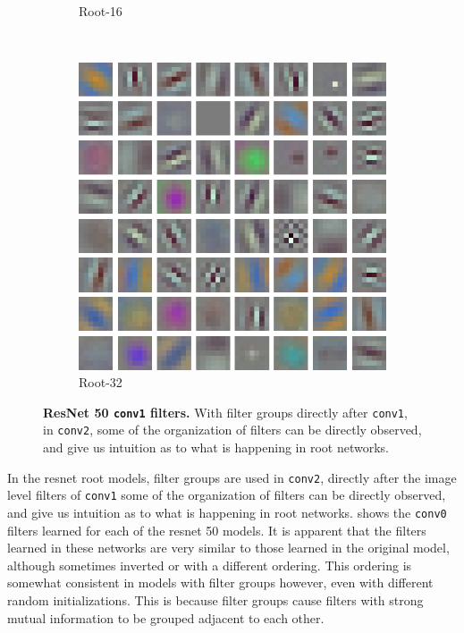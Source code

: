 \documentclass[thesis]{subfiles}
\begin{document}
\begin{figure}[tb]
\begin{subfigure}[b]{0.45\textwidth}
			\caption{Root-16}
			\label{fig:resnet50root16conv0}
		\end{subfigure}
		~
		\begin{subfigure}[b]{0.45\textwidth}
			\centering
			\includegraphics[width=\textwidth]{Figs/Raster/msrc-resnet-50-conv1-root64-convonly}
			\caption{Root-32}
			\label{fig:resnet50root32conv0}
		\end{subfigure}
		\caption[ResNet 50 conv1 filters]{\textbf{ResNet 50 \texttt{conv1} filters.} With filter groups directly after \texttt{conv1}, in \texttt{conv2}, some of the organization of filters can be directly observed, and give us intuition as to what is happening in root networks.}
		\label{fig:resnet50conv0}
	\end{figure}
	In the \gls{resnet} root models, filter groups are used in \texttt{conv2},  directly after the image level filters of \texttt{conv1} some of the organization of filters can be directly observed, and give us intuition as to what is happening in root networks.  shows the \texttt{conv0} filters learned for each of the \gls{resnet} 50 models. It is apparent that the filters learned in these networks are very similar to those learned in the original model, although sometimes inverted or with a different ordering. This ordering is somewhat consistent in models with filter groups however, even with different random initializations. This is because filter groups cause filters with strong mutual information to be grouped adjacent to each other.
	
\end{document}
